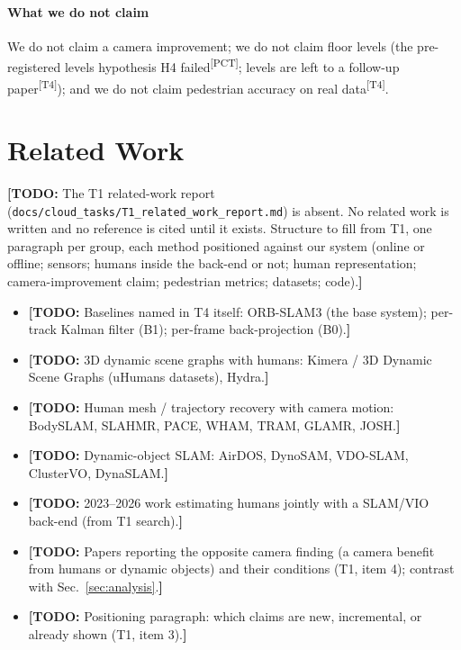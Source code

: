\documentclass[journal]{IEEEtran}
\newcommand{\TODO}[1]{{\color{red}\textbf{[TODO:} #1\textbf{]}}}
\newcommand{\src}[1]{\textsuperscript{\color{blue}\scriptsize[#1]}}
\begin{document}
\paragraph*{What we do not claim}
We do not claim a camera improvement; we do not claim floor levels (the
pre-registered levels hypothesis H4 failed\src{PCT}; levels are left to a
follow-up paper\src{T4}); and we do not claim pedestrian accuracy on real
data\src{T4}.

\section{Related Work}
\label{sec:related}

\TODO{The T1 related-work report (\texttt{docs/cloud\_tasks/T1\_related\_work\_report.md})
is absent. No related work is written and no reference is cited until it exists.
Structure to fill from T1, one paragraph per group, each method positioned
against our system (online or offline; sensors; humans inside the back-end
or not; human representation; camera-improvement claim; pedestrian metrics;
datasets; code).}

\begin{itemize}
  \item \TODO{Baselines named in T4 itself: ORB-SLAM3 (the base system);
  per-track Kalman filter (B1); per-frame back-projection (B0).}
  \item \TODO{3D dynamic scene graphs with humans: Kimera / 3D Dynamic Scene
  Graphs (uHumans datasets), Hydra.}
  \item \TODO{Human mesh / trajectory recovery with camera motion: BodySLAM,
  SLAHMR, PACE, WHAM, TRAM, GLAMR, JOSH.}
  \item \TODO{Dynamic-object SLAM: AirDOS, DynoSAM, VDO-SLAM, ClusterVO,
  DynaSLAM.}
  \item \TODO{2023--2026 work estimating humans jointly with a SLAM/VIO back-end
  (from T1 search).}
  \item \TODO{Papers reporting the opposite camera finding (a camera benefit from
  humans or dynamic objects) and their conditions (T1, item 4); contrast with
  Sec.~\ref{sec:analysis}.}
  \item \TODO{Positioning paragraph: which claims are new, incremental, or
  already shown (T1, item 3).}
\end{itemize}
\end{document}
